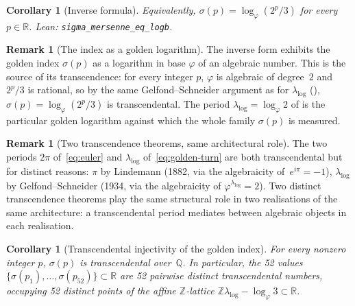 \documentclass[11pt]{amsart}
\newtheorem{Corollary}[Theorem]{Corollary}
\theoremstyle{definition}
\newtheorem{Remark}[Theorem]{Remark}
\newcommand{\golden}{\varphi}
\newcommand{\lean}[1]{\texttt{#1}}
\begin{document}
\begin{Corollary}[Inverse formula]\label{cor:inverse}
Equivalently, $\sigma(p)=\log_{\golden}(2^{p}/3)$ for every $p\in\mathbb{R}$.
Lean: \lean{sigma\_mersenne\_eq\_logb}.
\end{Corollary}

\begin{Remark}[The index as a golden logarithm]\label{rem:index-logarithm}
The inverse form exhibits the golden index $\sigma(p)$ as a logarithm in
base $\golden$ of an algebraic number.  This is the source of its
transcendence: for every integer $p$, $\golden$ is algebraic of
degree~$2$ and $2^{p}/3$ is rational, so by the same Gelfond--Schneider
argument as for $\lambda_{\log}$ (),
$\sigma(p)=\log_{\golden}(2^{p}/3)$ is transcendental.  The period
$\lambda_{\log}=\log_{\golden}2$ of  is the
particular golden logarithm against which the whole family $\sigma(p)$ is
measured.
\end{Remark}

\begin{Remark}[Two transcendence theorems, same architectural role]
\label{rem:two-transcendences}
The two periods $2\pi$ of~\eqref{eq:euler} and $\lambda_{\log}$
of~\eqref{eq:golden-turn} are both transcendental but for distinct
reasons: $\pi$ by Lindemann (1882, via the algebraicity
of~$e^{i\pi}=-1$), $\lambda_{\log}$ by Gelfond--Schneider (1934, via
the algebraicity of $\golden^{\lambda_{\log}}=2$).  Two distinct
transcendence theorems play the same structural role in two
realisations of the same architecture: a transcendental period
mediates between algebraic objects in each realisation.
\end{Remark}

\begin{Corollary}[Transcendental injectivity of the golden index]
\label{cor:linear-independence}
For every nonzero integer $p$, $\sigma(p)$ is transcendental
over~$\mathbb{Q}$.  In particular, the 52 values
$\{\sigma(p_{1}),\ldots,\sigma(p_{52})\}\subset\mathbb{R}$ are 52 pairwise
distinct transcendental numbers, occupying 52 distinct points of the
affine $\mathbb{Z}$-lattice $\mathbb{Z}\lambda_{\log}-\log_{\golden}3\subset\mathbb{R}$.
\end{Corollary}
\end{document}
